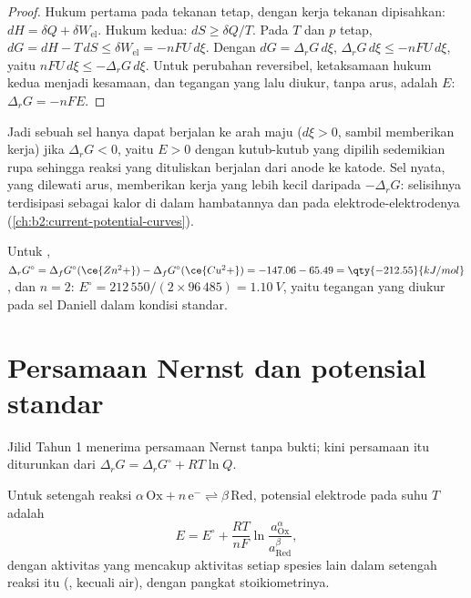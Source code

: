 \begin{proof}
Hukum pertama pada tekanan tetap, dengan kerja tekanan dipisahkan:
$dH = \delta Q + \delta W_{\text{el}}$. Hukum kedua: $dS \geq \delta Q/T$.
Pada $T$ dan $p$ tetap,
$dG = dH - T\,dS \leq \delta W_{\text{el}} = -nFU\,d\xi$. Dengan
$dG = \Delta_r G\,d\xi$, $\Delta_r G\,d\xi \leq -nFU\,d\xi$, yaitu
$nFU\,d\xi \leq -\Delta_r G\,d\xi$. Untuk perubahan reversibel,
ketaksamaan hukum kedua menjadi kesamaan, dan tegangan yang lalu diukur,
tanpa arus, adalah $E$: $\Delta_r G = -nFE$.
\end{proof}

Jadi sebuah sel hanya dapat berjalan ke arah maju ($d\xi > 0$, sambil
memberikan kerja) jika $\Delta_r G <
0$, yaitu $E > 0$ dengan kutub-kutub
yang dipilih sedemikian rupa sehingga reaksi yang dituliskan berjalan dari
anode ke katode. Sel nyata, yang dilewati arus, memberikan kerja yang lebih
kecil daripada $-\Delta_r G$: selisihnya terdisipasi sebagai kalor di
dalam hambatannya dan pada elektrode-elektrodenya
(\cref{ch:b2:current-potential-curves}).

\begin{example}\label{ex:b2:cell-thermodynamics:daniell}
Untuk , $\Delta_r G^\circ = \Delta_f G^\circ(\ce{Zn^2+}) -
\Delta_f G^\circ(\ce{Cu^2+}) = -147.06 - 65.49 = \qty{-212.55}{kJ/mol}$, dan
$n = 2$: $E^\circ = 212\,550/(2 \times 96\,485) = \qty{1.10}{V}$, yaitu
tegangan yang diukur pada sel Daniell dalam kondisi standar.
\end{example}

\section{Persamaan Nernst dan potensial standar}

Jilid Tahun 1 menerima persamaan Nernst tanpa bukti; kini persamaan itu
diturunkan dari $\Delta_r G = \Delta_r G^\circ + RT\ln Q$.

\begin{theorem}\label{thm:b2:cell-thermodynamics:nernst-derived}
Untuk setengah reaksi $\alpha\,\mathrm{Ox} + n\,\mathrm e^- \rightleftharpoons
\beta\,\mathrm{Red}$, potensial elektrode pada suhu $T$ adalah
\[
  E = E^\circ + \frac{RT}{nF}\ln\frac{a_{\mathrm{Ox}}^{\alpha}}{a_{\mathrm{Red}}^{\beta}} ,
\]
dengan aktivitas yang mencakup aktivitas setiap spesies lain dalam
setengah reaksi itu (, kecuali air), dengan pangkat
stoikiometrinya.
\end{theorem}

